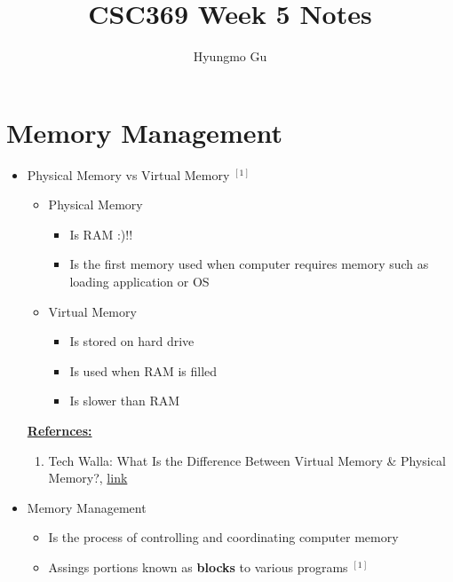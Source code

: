 \documentclass[12pt]{article}
\begin{document}
\title{CSC369 Week 5 Notes}
\author{Hyungmo Gu}
\maketitle

\bigskip

\section{Memory Management}

\begin{itemize}
    \item Physical Memory vs Virtual Memory $^{[1]}$
    \begin{itemize}
        \item Physical Memory
        \begin{itemize}
            \item Is RAM :)!!
            \item Is the first memory used when computer requires memory such as
            loading application or OS
        \end{itemize}
        \item Virtual Memory
        \begin{itemize}
            \item Is stored on hard drive
            \item Is used when RAM is filled
            \item Is slower than RAM
        \end{itemize}
    \end{itemize}

    \bigskip

    \underline{\textbf{Refernces:}}

    \bigskip

    \begin{enumerate}[1)]
        \item Tech Walla: What Is the Difference Between Virtual Memory \& Physical Memory?, \href{https://www.techwalla.com/articles/difference-virtual-memory-physical-memory_}{link}
    \end{enumerate}

    \item Memory Management
    \begin{itemize}
        \item Is the process of controlling and coordinating computer memory
        \item Assings portions known as \textbf{blocks} to various programs $^{[1]}$
    \end{itemize}


\end{itemize}
\end{document}
